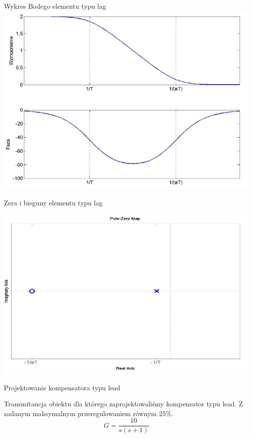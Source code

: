 \documentclass{beamer}
\begin{document}
\begin{frame}{Wykres Bodego elementu typu lag}
	\includegraphics[width = \linewidth]{lag}
\end{frame}
\begin{frame}{Zera i bieguny elementu typu lag}

	\includegraphics[width = \linewidth]{pole_lag}
\end{frame}	

\begin{frame}{Projektowanie kompensatora typu lead}

Transmitancja obiektu dla którego zaprojektowaliśmy kompensator typu lead. Z zadanym maksymalnym przeregulowaniem równym 25\%. 
	\begin{equation*}
	G = \frac{10}{s(s+1)}
	\end{equation*}

\end{frame}
	
\end{document}

